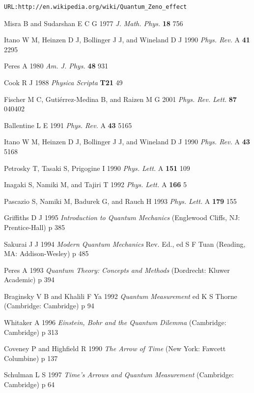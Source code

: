 \documentclass[letterpaper]{jpconf}
\begin{document}
\begin{thebibliography}{99}

\begin{verbatim}
URL:http://en.wikipedia.org/wiki/Quantum_Zeno_effect\end{verbatim}

Misra B and Sudarshan E C G 1977 {\it J. Math.
Phys.} {\bf 18} 756

Itano W M, Heinzen D J, Bollinger J J, and Wineland
D J 1990 {\it Phys. Rev.} A {\bf 41} 2295

Peres A 1980 {\it Am. J. Phys.} {\bf 48} 931

Cook R J 1988 {\it Physica Scripta} {\bf T21} 49

Fischer M C, Guti\'errez-Medina B, and Raizen M G
2001 {\it Phys. Rev. Lett.} {\bf 87} 040402

Ballentine L E 1991 {\it Phys. Rev.} A {\bf
43} 5165

Itano W M, Heinzen D J, Bollinger J J, and Wineland
D J 1990 {\it Phys. Rev.} A {\bf 43} 5168

Petrosky T, Tasaki S, Prigogine I 1990 {\it
Phys. Lett.} A {\bf 151} 109

Inagaki S, Namiki M, and Tajiri T 1992 {\it Phys.
Lett.} A {\bf 166} 5

Pascazio S, Namiki M, Badurek G, and Rauch H
1993 {\it Phys. Lett.} A {\bf 179} 155

Griffiths D J 1995 {\it Introduction to Quantum
Mechanics} (Englewood Cliffs, NJ: Prentice-Hall) p 385

Sakurai J J 1994 {\it Modern Quantum Mechanics}
Rev. Ed., ed S F Tuan (Reading, MA: Addison-Wesley) p 485

Peres A 1993 {\it Quantum Theory: Concepts and Methods}
(Dordrecht: Kluwer Academic) p 394

Braginsky V B and Khalili F Ya 1992 {\it
Quantum Measurement} ed K S Thorne (Cambridge: Cambridge) p 94

Whitaker A 1996 {\it Einstein, Bohr and the
Quantum Dilemma} (Cambridge: Cambridge) p 313

Coveney P and Highfield R 1990 {\it The Arrow of
Time} (New York: Fawcett Columbine) p 137

Schulman L S 1997 {\it Time's Arrows and Quantum
Measurement} (Cambridge: Cambridge) p 64


\end{thebibliography}
\end{document}
